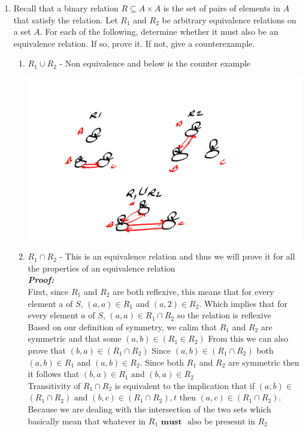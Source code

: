 \documentclass[12pt]{article}
\begin{document}
\begin{enumerate}
\item Recall that a binary relation $R \subseteq A \times A$ is the set of pairs of elements in $A$ that satisfy the relation. Let $R_1$ and $R_2$ be arbitrary equivalence relations on a set $A$. For each of the following, determine whether it must also be an equivalence relation. If so, prove it. If not, give a counterexample.
\begin{enumerate}
\item $R_1 \cup R_2$ - Non equivalence and below is the counter example
    \begin{center}
    \includegraphics[scale=0.24]{3a.png}
    \end{center}
\item $R_1 \cap R_2$ - This is an equivalence relation  and thus we will prove it for all the properties of an equivalence relation\\
    \textbf{\textit{Proof: }} \\
    First, since $R_1$ and $R_2$ are both reflexive, this means that for every element a of $S$, $(a,a) \in R_1$ and $(a,2) \in R_2$. Which implies that for every element $a$ of $S$, $(a,a) \in R_1 \cap R_2$ so the relation is reflexive\\
    Based on our definition of symmetry, we calim that $R_{1}$ and $R_2$ are symmetric and that some $(a,b) \in (R_{1} \in R_2)$ From this we can also prove that $(b,a) \in (R_{1} \cap R_2)$ Since $(a,b) \in (R_{1} \cap R_2)$ both $(a,b) \in R_{1}$ and $(a,b) \in R_2$. Since both $R_{1}$ and $R_2$ are symmetric then it follows that $(b,a) \in R_{1} \text{ and } (b,a) \in R_2$ \\
    Transitivity of $R_1 \cap R_2$ is equivalent to the implication that if $(a, b) \in$ 
    $(R_1 \cap R_2) \text{ and }  (b, c) \in (R_1 \cap R_2), t\text{ then } (a, c) \in (R_1 \cap R_2)$. Because we are dealing with the intersection of the two sets which basically mean that whatever in $R_1 \textbf{ must } \text{ also be presesnt in } R_2$


\end{enumerate}
\end{enumerate}
\end{document}
